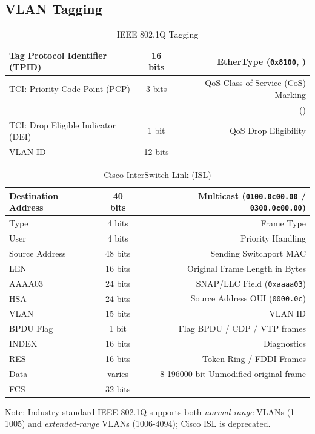 \documentclass[12pt]{article}
\newif\ifcolor											%
\newcommand{\note}[1]{\ifcolor \colorbox{#1}{Note:}\else \underline{Note:}\fi}
\begin{document}
	\subsection{VLAN Tagging \label{subsec:VLAN TAGGING}}
	\begin{table}[H]
	\centering
	\caption{IEEE 802.1Q Tagging \label{tab:802.1Q}}
	\begin{tabular}{| l | c | r |}\hline
	Tag Protocol Identifier (TPID)		& 16 bits	& EtherType (\texttt{0x8100}, \Cref{tab:ETHERTYPE})\\\hline
	TCI: Priority Code Point (PCP)		& 3 bits	& QoS Class-of-Service (CoS) Marking\\
							&		& (\Cref{sec:QOS})\\\hline
	TCI: Drop Eligible Indicator (DEI)	& 1 bit 	& QoS Drop Eligibility\\\hline
	VLAN ID 					& 12 bits	&\\\hline
	\end{tabular}\end{table}

	\begin{table}[H]
	\centering
	\caption{Cisco InterSwitch Link (ISL) \label{tab:CISCO ISL}}
	\begin{tabular}{| l | c | r |}\hline
	Destination Address	& 40 bits	& Multicast (\texttt{0100.0c00.00} / \texttt{0300.0c00.00})\\\hline
	Type				& 4 bits	& Frame Type\\\hline
	User				& 4 bits	& Priority Handling\\\hline
	Source Address		& 48 bits	& Sending Switchport MAC\\\hline
	LEN				& 16 bits	& Original Frame Length in Bytes\\\hline
	AAAA03			& 24 bits	& SNAP/LLC Field (\texttt{0xaaaa03})\\\hline
	HSA				& 24 bits	& Source Address OUI (\texttt{0000.0c})\\\hline
	VLAN				& 15 bits	& VLAN ID\\\hline
	BPDU Flag			& 1 bit 	& Flag BPDU / CDP / VTP frames\\\hline
	INDEX			& 16 bits	& Diagnostics\\\hline
	RES				& 16 bits	& Token Ring / FDDI Frames\\\hline
	Data				& varies	& 8-196000 bit Unmodified original frame\\\hline
	FCS				& 32 bits	&\\\hline
	\end{tabular}\end{table}
	\note{Goldenrod} Industry-standard IEEE 802.1Q supports both \textit{normal-range} VLANs (1-1005) and \textit{extended-range} VLANs (1006-4094); Cisco ISL is deprecated.
\end{document}
